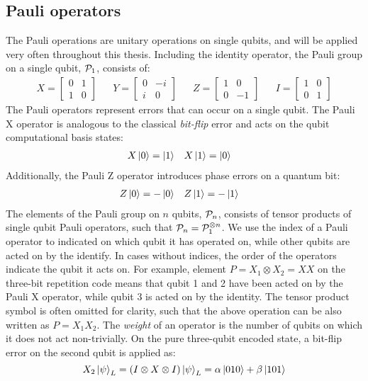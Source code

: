 \subsection{Pauli operators}\label{subsec:pauli}

The Pauli operations are unitary operations on single qubits, and will be applied very often throughout this thesis. Including the identity operator, the Pauli group on a single qubit, $\mathcal{P}_1$, consists of:
\begin{align}
  X = \begin{bmatrix} 0 & 1 \\ 1 & 0 \end{bmatrix} &&
  Y = \begin{bmatrix} 0 & -i \\ i & 0 \end{bmatrix} &&
  Z = \begin{bmatrix} 1 & 0 \\ 0 & -1 \end{bmatrix} &&
  I = \begin{bmatrix} 1 & 0 \\ 0 & 1 \end{bmatrix}
\end{align}
The Pauli operators represent errors that can occur on a single qubit. The Pauli X operator is analogous to the classical \emph{bit-flip} error and acts on the qubit computational basis states:
\begin{align}\label{eqq:qec_bitflip}
  & X\ket{0} = \ket{1} && X\ket{1} = \ket{0} &
\end{align}
Additionally, the Pauli Z operator introduces phase errors on a quantum bit:
\begin{align}\label{eq:eqc_phaseflip}
  & Z\ket{0} = -\ket{0} && Z\ket{1} = -\ket{1} &
\end{align}
The elements of the Pauli group on $n$ qubits, $\mathcal{P}_n$, consists of tensor products of single qubit Pauli operators, such that  $\mathcal{P}_n = \mathcal{P}_1^{\otimes n}$. We use the index of a Pauli operator to indicated on which qubit it has operated on, while other qubits are acted on by the identify. In cases without indices, the order of the operators indicate the qubit it acts on. For example, element $P=X_1\otimes X_2 = XX$ on the three-bit repetition code means that qubit 1 and 2 have been acted on by the Pauli X operator, while qubit 3 is acted on by the identity. The tensor product symbol is often omitted for clarity, such that the above operation can be also written as  $P=X_1X_2$. The \emph{weight} of an operator is the number of qubits on which it does not act non-trivially. On the pure  three-qubit encoded state, a bit-flip error on the second qubit is applied as:
\begin{equation}\label{eq:qec_3bitflip}
  X_2\ket{\psi}_L = (I\otimes X \otimes I) \ket{\psi}_L = \alpha\ket{010} + \beta\ket{101}
\end{equation}

